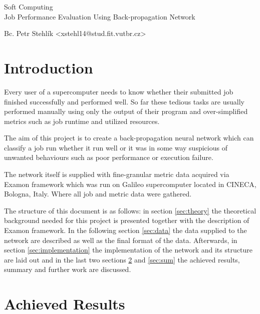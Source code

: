 \documentclass[11pt,a4paper]{article}
\begin{document}
\begin{center}
	\LARGE{Soft Computing}\\
	\Large{Job Performance Evaluation Using Back-propagation Network}
	\vspace{0.5cm}

    \begin{centering}
    \small{
        Bc. Petr Stehlík <xstehl14@stud.fit.vutbr.cz>
        }
    \end{centering}

	\vspace{0.2cm}

\end{center}

\section{Introduction}
Every user of a supercomputer needs to know whether their submitted job finished successfully and performed well. So far these tedious tasks are usually performed manually using only the output of their program and over-simplified metrics such as job runtime and utilized resources.

The aim of this project is to create a back-propagation neural network which can classify a job run whether it run well or it was in some way suspicious of unwanted behaviours such as poor performance or execution failure.

The network itself is supplied with fine-granular metric data acquired via Examon framework\cite{examon} which was run on Galileo supercomputer located in CINECA, Bologna, Italy. Where all job and metric data were gathered.

The structure of this document is as follows: in section \ref{sec:theory} the theoretical background needed for this project is presented together with the description of Examon framework. In the following section \ref{sec:data} the data supplied to the network are described as well as the final format of the data. Afterwards, in section \ref{sec:implementation} the implementation of the network and its structure are laid out and in the last two sections \ref{sec:res} and \ref{sec:sum} the achieved results, summary and further work are discussed.







\section{Achieved Results}
\label{sec:res}
\end{document}
